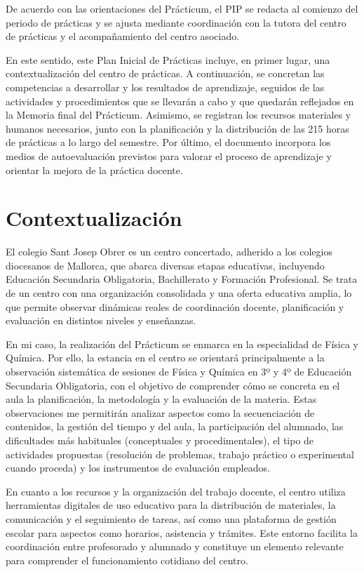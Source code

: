 \documentclass[12pt,a4paper]{article}
\begin{document}
De acuerdo con las orientaciones del Prácticum, el PIP se redacta al comienzo del periodo de prácticas y se ajusta mediante coordinación con la tutora del centro de prácticas y el acompañamiento del centro asociado.

En este sentido, este Plan Inicial de Prácticas incluye, en primer lugar, una contextualización del centro de prácticas. A continuación, se concretan las competencias a desarrollar y los resultados de aprendizaje, seguidos de las actividades y procedimientos que se llevarán a cabo y que quedarán reflejados en la Memoria final del Prácticum. Asimismo, se registran los recursos materiales y humanos necesarios, junto con la planificación y la distribución de las 215 horas de prácticas a lo largo del semestre. Por último, el documento incorpora los medios de autoevaluación previstos para valorar el proceso de aprendizaje y orientar la mejora de la práctica docente.

\section{Contextualización}\label{subsec:centro}
El colegio Sant Josep Obrer es un centro concertado, adherido a los colegios diocesanos de Mallorca, que abarca diversas etapas educativas, incluyendo Educación Secundaria Obligatoria, Bachillerato y Formación Profesional. Se trata de un centro con una organización consolidada y una oferta educativa amplia, lo que permite observar dinámicas reales de coordinación docente, planificación y evaluación en distintos niveles y enseñanzas.

En mi caso, la realización del Prácticum se enmarca en la especialidad de Física y Química. Por ello, la estancia en el centro se orientará principalmente a la observación sistemática de sesiones de Física y Química en 3º y 4º de Educación Secundaria Obligatoria, con el objetivo de comprender cómo se concreta en el aula la planificación, la metodología y la evaluación de la materia. Estas observaciones me permitirán analizar aspectos como la secuenciación de contenidos, la gestión del tiempo y del aula, la participación del alumnado, las dificultades más habituales (conceptuales y procedimentales), el tipo de actividades propuestas (resolución de problemas, trabajo práctico o experimental cuando proceda) y los instrumentos de evaluación empleados.

En cuanto a los recursos y la organización del trabajo docente, el centro utiliza herramientas digitales de uso educativo para la distribución de materiales, la comunicación y el seguimiento de tareas, así como una plataforma de gestión escolar para aspectos como horarios, asistencia y trámites. Este entorno facilita la coordinación entre profesorado y alumnado y constituye un elemento relevante para comprender el funcionamiento cotidiano del centro.
\end{document}
